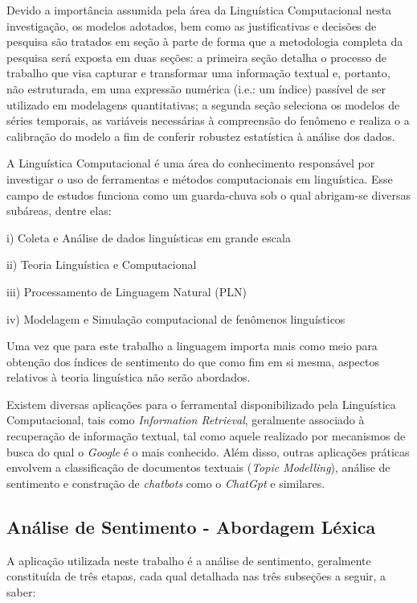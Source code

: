 Devido a importância assumida pela área da Linguística Computacional nesta investigação, os modelos adotados, bem como as justificativas e decisões de pesquisa são tratados em seção à parte de forma que a metodologia completa da pesquisa será exposta em duas seções: a primeira seção detalha o processo de trabalho que visa capturar e transformar uma informação textual e, portanto, não estruturada, em uma expressão numérica (i.e.: um índice) passível de ser utilizado em modelagens quantitativas; a segunda seção seleciona os modelos de séries temporais, as variáveis necessárias à compreensão do fenômeno e realiza o a calibração do modelo a fim de conferir robustez estatística à análise dos dados.

A Linguística Computacional é uma área do conhecimento responsável por investigar o uso de ferramentas e métodos computacionais em linguística. Esse campo de estudos funciona como um guarda-chuva sob o qual abrigam-se diversas subáreas, dentre elas:

i) Coleta e Análise de dados linguísticas em grande escala

ii) Teoria Linguística e Computacional

iii) Processamento de Linguagem Natural (PLN)

iv) Modelagem e Simulação computacional de fenômenos linguísticos

Uma vez que para este trabalho a linguagem importa mais como meio  para obtenção dos índices de sentimento  do que como fim em si mesma, aspectos relativos à teoria linguística não serão abordados.

Existem diversas aplicações para o ferramental disponibilizado pela Linguística Computacional, tais como \textit{Information Retrieval}, geralmente associado à recuperação de informação textual, tal como aquele realizado por mecanismos de busca do qual o \textit{Google} é o mais conhecido. Além disso, outras aplicações práticas envolvem a classificação de documentos textuais (\textit{Topic Modelling}), análise de sentimento e construção de \textit{chatbots} como o \textit{ChatGpt} e similares.



\subsection{Análise de Sentimento - Abordagem Léxica}

A aplicação utilizada neste trabalho é a análise de sentimento, geralmente constituída de três etapas, cada qual detalhada nas três subseções a seguir, a saber:

